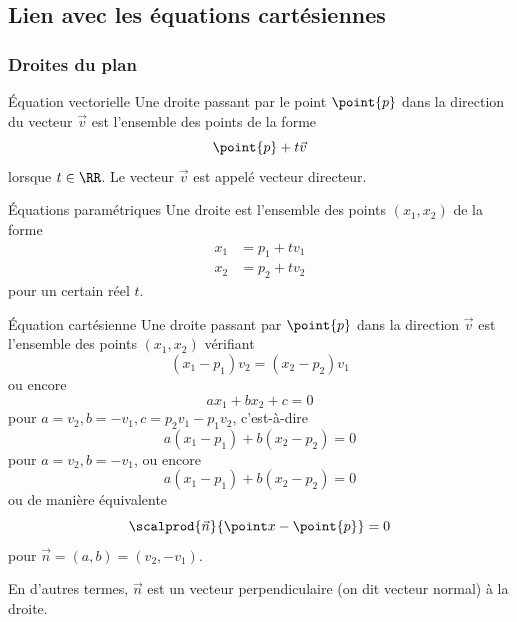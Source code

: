 \subsection{Lien avec les équations cartésiennes}
\subsubsection{Droites du plan}
\begin{frame}
  \begin{block}{Équation vectorielle}
    Une droite passant par le point \(\point{p}\) dans la direction du vecteur \(\vec{v}\) est l'ensemble des points de la forme
    \begin{equation*}
      \point{p} + t \vec{v}
    \end{equation*}
    lorsque \(t \in \RR\). Le vecteur \(\vec{v}\) est appelé vecteur directeur.
  \end{block}
  \begin{block}{Équations paramétriques}
    Une droite est l'ensemble des points \((x_{1},x_{2})\) de la forme
    \begin{align*}
      x_{1} &= p_1 + t v_1\\
      x_{2} &= p_2 + t v_2
    \end{align*}
    pour un certain réel \(t\).
  \end{block}
\end{frame}
\begin{frame}
\begin{block}{Équation cartésienne}
    Une droite passant par \(\point{p}\) dans la direction \(\vec v\) est l'ensemble des points \((x_{1},x_{2})\) vérifiant
    \begin{equation*}
      (x_{1}-p_{1})v_{2} = (x_{2}-p_{2})v_{1}
    \end{equation*}
    ou encore
    \begin{equation*}
      a x_{1} + b x_{2} + c = 0
    \end{equation*}
    pour \(a = v_{2}, b = -v_{1}, c = p_{2} v_{1} - p_{1} v_{2}\), c'est-à-dire
    \begin{equation*}
      a (x_{1} - p_{1}) + b (x_{2}-p_{2}) = 0
    \end{equation*}
    pour \(a = v_{2}, b = -v_{1}\), ou encore
    \begin{equation*}
      a (x_{1} - p_{1}) + b (x_{2}-p_{2}) = 0
    \end{equation*}
    ou de manière équivalente
    \begin{equation*}
      \scalprod{\vec n}{\point x - \point{p}} = 0
    \end{equation*}
    pour \(\vec{n} = (a,b) = (v_{2},-v_{1})\).

    En d'autres termes, \(\vec{n}\) est un vecteur perpendiculaire (on dit \og vecteur normal\fg{}) à la droite.
  \end{block}
 \end{frame}

